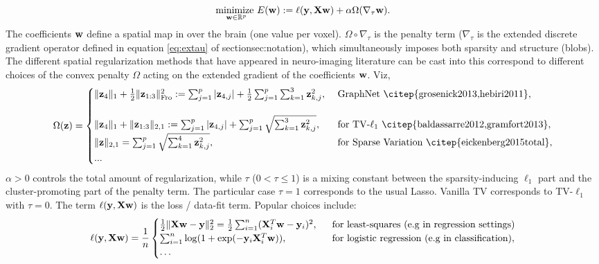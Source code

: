 \begin{equation}
  \underset{\mathbf{w} \in \mathbb R^p}{\text{minimize }}E(\mathbf{w}) := \ell(\mathbf{y},\mathbf{X}\mathbf{w}) + \alpha \Omega(\nabla_\tau\mathbf{w}).
    \label{eq:opt_pb}
\end{equation}
The coefficients ${\mathbf{w}}$ define a spatial map in over the brain (one value per voxel).
$\Omega \circ \nabla_\tau$ is the penalty term ($\nabla_\tau$ is the extended discrete gradient operator defined in equation \eqref{eq:extau} of section{sec:notation}), which simultaneously imposes both sparsity and structure (blobs). The different spatial regularization
methods that have appeared in neuro-imaging literature can be cast into this
correspond to different choices of the convex penalty $\Omega$ acting on the extended gradient of the coefficients $\mathbf{w}$. Viz,
\[
  \begin{split}
  \Omega(\z) = \begin{cases}
      \|\z_4\|_1 + \frac{1}{2}\|\z_{1:3}\|_{\text{Fro}}^2 := \sum_{j=1}^p|\z_{4,j}| + \frac{1}{2}\sum_{j=1}^{p}\sum_{k=1}^3\z_{k,j}^2, &\mbox{ GraphNet \citep{grosenick2013,hebiri2011}},\\\\
      \|\z_4\|_1 + \|\z_{1:3}\|_{2,1} := \sum_{j=1}^p|\z_{4,j}| + \sum_{j=1}^{p}\sqrt{\sum_{k=1}^3\z_{k,j}^2}, &\mbox{ for TV-$\ell_1$ \citep{baldassarre2012,gramfort2013}},\\
      \|\z\|_{2,1} = \sum_{j=1}^{p}\sqrt{\sum_{k=1}^4\z_{k,j}^2}, &\mbox{ for Sparse Variation \citep{eickenberg2015total}},\\
      ...
    \end{cases}
  \end{split}
\]
{$\alpha > 0$} controls the total amount of regularization, while
  {$\tau$
    ($0 < \tau \le 1$)} is a
  mixing constant between
  the {sparsity-inducing} $\ell_1$ part and the
  {cluster-promoting} part of the penalty term.
  The particular case {$\tau = 1$} corresponds to the usual Lasso. Vanilla TV  \citep{michel2011tv} corresponds to TV-$\ell_1$ with $\tau = 0$.
The term {$\ell(\mathbf{y},\mathbf{X}\mathbf{w})$} is the
  {loss / data-fit term}. Popular choices include:
  $$
  \ell(\mathbf{y},\mathbf{X}\mathbf{w}) = \frac{1}{n}\begin{cases}\frac{1}{2}\|\mathbf{X}\mathbf{w} - \mathbf{y}\|_2^2 = \frac{1}{2}\sum_{i=1}^n(\mathbf{X}^T_i\mathbf{w} - \mathbf{y}_i)^2,
    &\mbox{ \text{ for least-squares (e.g in regression settings)}}\\
    \sum_{i=1}^n \log(1+\exp(-\mathbf{y}_i\mathbf{X}_i^T\mathbf{w})),
    &\mbox{ \text{ for logistic regression (e.g in classification)}},\\\ldots\end{cases}$$

